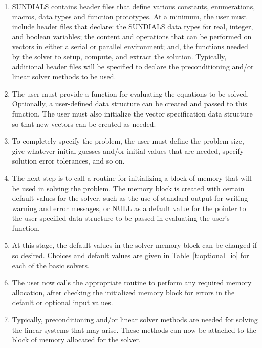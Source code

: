 \begin{enumerate}

\item \label{sun_headers}
SUNDIALS contains header files that define various constants,
enumerations, macros, data types and function prototypes.  At a
minimum, the user must include header files that declare: the SUNDIALS
data types for real, integer, and boolean variables; the content and
operations that can be performed on vectors in either a serial or
parallel environment; and, the functions needed by the solver to
setup, compute, and extract the solution. Typically, additional header
files will be specified to declare the preconditioning and/or linear
solver methods to be used.

\item \label{sun_problem}
The user must provide a function for evaluating the equations to be
solved. Optionally, a user-defined data structure can be created and
passed to this function. The user must also initialize the vector
specification data structure so that new vectors can be created as needed.

\item \label{sun_size}
To completely specify the problem, the user must define the problem
size, give whatever initial guesses and/or initial values that are
needed, specify solution error tolerances, and so on. 

\item \label{sun_create}
The next step is to call a routine for initializing a block of memory
that will be used in solving the problem. The memory block is created
with certain default values for the solver, such as the use of
standard output for writing warning and error messages, or NULL
as a default value for the pointer to the user-specified data
structure to be passed in evaluating the user's function.

\item \label{sun_set}
At this stage, the default values in the solver memory block can be
changed if so desired. Choices and default values are given in
Table~\ref{t:optional_io} for each of the basic solvers.

\item \label{sun_malloc}
The user now calls the appropriate routine to perform any required
memory allocation, after checking the initialized memory block for
errors in the default or optional input values.

\item \label{sun_linear}
Typically, preconditioning and/or linear solver methods are needed for
solving the linear systems that may arise. These methods can now be
attached to the block of memory allocated for the solver.


\end{enumerate}
